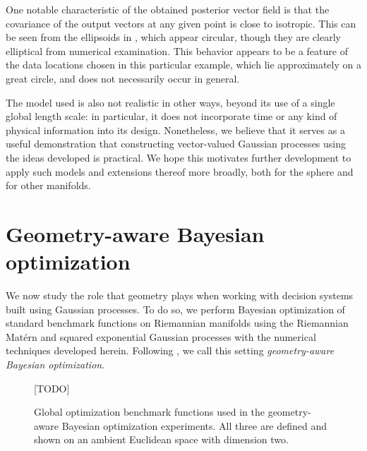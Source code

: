 \documentclass[11pt]{book}
\begin{document}
One notable characteristic of the obtained posterior vector field is that the covariance of the output vectors at any given point is close to isotropic.
This can be seen from the ellipsoids in , which appear circular, though they are clearly elliptical from numerical examination.
This behavior appears to be a feature of the data locations chosen in this particular example, which lie approximately on a great circle, and does not necessarily occur in general.

The model used is also not realistic in other ways, beyond its use of a single global length scale: in particular, it does not incorporate time or any kind of physical information into its design.
Nonetheless, we believe that it serves as a useful demonstration that constructing vector-valued Gaussian processes using the ideas developed is practical.
We hope this motivates further development to apply such models and extensions thereof more broadly, both for the sphere and for other manifolds.

\section{Geometry-aware Bayesian optimization}

We now study the role that geometry plays when working with decision systems built using Gaussian processes.
To do so, we perform Bayesian optimization of standard benchmark functions on Riemannian manifolds using the Riemannian Matérn and squared exponential Gaussian processes with the numerical techniques developed herein.
Following \textcite{jaquier20}, we call this setting \emph{geometry-aware Bayesian optimization}.

\begin{figure}
\vspace*{10ex}
[TODO]
\vspace*{10ex}
\caption{Global optimization benchmark functions used in the geometry-aware Bayesian optimization experiments. All three are defined and shown on an ambient Euclidean space with dimension two.}
\label{fig:benchmark-functions}
\end{figure}
\end{document}
